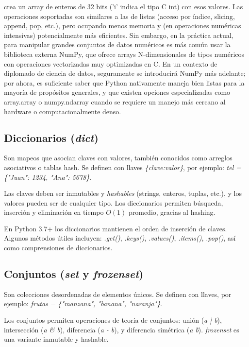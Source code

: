 crea un array de enteros de 32 bits ('i' indica el tipo C int) con esos valores. Las operaciones soportadas son similares a las de listas (acceso por índice, slicing, append, pop, etc.), pero ocupando menos memoria y (en operaciones numéricas intensivas) potencialmente más eficientes. Sin embargo, en la práctica actual, para manipular grandes conjuntos de datos numéricos es más común usar la biblioteca externa NumPy, que ofrece arrays N-dimensionales de tipos numéricos con operaciones vectorizadas muy optimizadas en C. En un contexto de diplomado de ciencia de datos, seguramente se introducirá NumPy más adelante; por ahora, es suficiente saber que Python nativamente maneja bien listas para la mayoría de propósitos generales, y que existen opciones especializadas como array.array o numpy.ndarray cuando se requiere un manejo más cercano al hardware o computacionalmente denso.

\subsection*{Diccionarios (\textit{dict})}
Son mapeos que asocian claves con valores, también conocidos como arreglos asociativos o tablas hash.  
Se definen con llaves \textit{\{clave:valor\}}, por ejemplo: \textit{tel = \{"Juan": 1234, "Ana": 5678\}}.  

Las claves deben ser inmutables y \textit{hashables} (strings, enteros, tuplas, etc.), 
y los valores pueden ser de cualquier tipo.  
Los diccionarios permiten búsqueda, inserción y eliminación en tiempo $O(1)$ promedio, gracias al hashing.  

En Python 3.7+ los diccionarios mantienen el orden de inserción de claves. 
Algunos métodos útiles incluyen: \textit{.get()}, \textit{.keys()}, \textit{.values()}, \textit{.items()}, 
\textit{.pop()}, así como comprensiones de diccionarios.  

\subsection*{Conjuntos (\textit{set} y \textit{frozenset})}
Son colecciones desordenadas de elementos únicos. Se definen con llaves, por ejemplo:  
\textit{frutas = \{"manzana", "banana", "naranja"\}}.  

Los conjuntos permiten operaciones de teoría de conjuntos: unión (\textit{a | b}), 
intersección (\textit{a \& b}), diferencia (\textit{a - b}), y diferencia simétrica (\textit{a \^ b}).  
\textit{frozenset} es una variante inmutable y hashable.  

